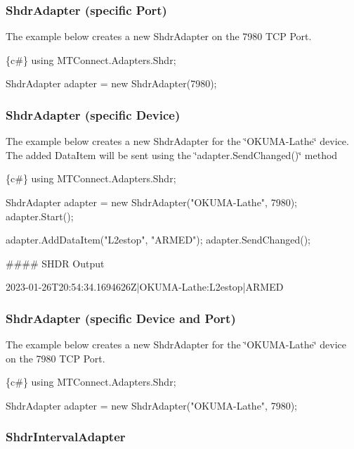 \subsubsection*{Shdr\+Adapter (specific Port)}

The example below creates a new Shdr\+Adapter on the 7980 T\+CP Port. 
\begin{DoxyCode}
\{c#\}
using MTConnect.Adapters.Shdr;

ShdrAdapter adapter = new ShdrAdapter(7980);
\end{DoxyCode}


\subsubsection*{Shdr\+Adapter (specific Device)}

The example below creates a new Shdr\+Adapter for the \char`\"{}\+O\+K\+U\+M\+A-\/\+Lathe\char`\"{} device. The added Data\+Item will be sent using the \char`\"{}adapter.\+Send\+Changed()\char`\"{} method 
\begin{DoxyCode}
\{c#\}
using MTConnect.Adapters.Shdr;

ShdrAdapter adapter = new ShdrAdapter("OKUMA-Lathe", 7980);
adapter.Start();

adapter.AddDataItem("L2estop", "ARMED");
adapter.SendChanged();
\end{DoxyCode}
 \#\#\#\# S\+H\+DR Output 
\begin{DoxyCode}
2023-01-26T20:54:34.1694626Z|OKUMA-Lathe:L2estop|ARMED
\end{DoxyCode}


\subsubsection*{Shdr\+Adapter (specific Device and Port)}

The example below creates a new Shdr\+Adapter for the \char`\"{}\+O\+K\+U\+M\+A-\/\+Lathe\char`\"{} device on the 7980 T\+CP Port. 
\begin{DoxyCode}
\{c#\}
using MTConnect.Adapters.Shdr;

ShdrAdapter adapter = new ShdrAdapter("OKUMA-Lathe", 7980);
\end{DoxyCode}


\subsubsection*{Shdr\+Interval\+Adapter}

